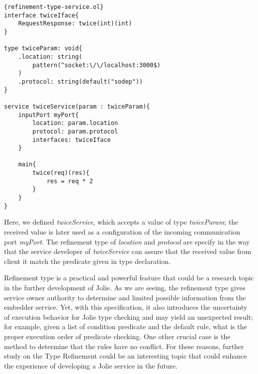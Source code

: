 \begin{listing}[ht]
    \lstset{language=Jolie,
        style=codeStyle,
        numbers=left,
        firstnumber=1
    }
    \begin{lstlisting}[frame=tlrb,
basicstyle=\footnotesize]{refinement-type-service.ol}
interface twiceIface{
    RequestResponse: twice(int)(int)
}

type twiceParam: void{
    .location: string(
        pattern(^socket:\/\/localhost:3000$)
    )
    .protocol: string(default("sodep"))
}

service twiceService(param : twiceParam){
    inputPort myPort{
        location: param.location
        protocol: param.protocol
        interfaces: twiceIface
    }

    main{
        twice(req)(res){
            res = req * 2
        }
    }
}
\end{lstlisting}
    \caption{Jolie example service for refinement type}
    \label{fig:jolie-refinement-example}
\end{listing}

Here, we defined \textit{twiceService}, which accepts a value of type \textit{twiceParam}; the received value is later used as a configuration of the incoming communication port \textit{myPort}. The refinement type of \textit{location} and \textit{protocol} are specify in the way that the service developer of \textit{twiceService} can assure that the received value from client it match the predicate given in type declaration.

Refinement type is a practical and powerful feature that could be a research topic in the further development of Jolie. As we are seeing, the refinement type gives service owner authority to determine and limited possible information from the embedder service. Yet, with this specification, it also introduces the uncertainty of execution behavior for Jolie type checking and may yield an unexpected result; for example, given a list of condition predicate and the default rule, what is the proper execution order of predicate checking. One other crucial case is the method to determine that the rules have no conflict. For these reasons,  further study on the Type Refinement could be an interesting topic that could enhance the experience of developing a Jolie service in the future.
